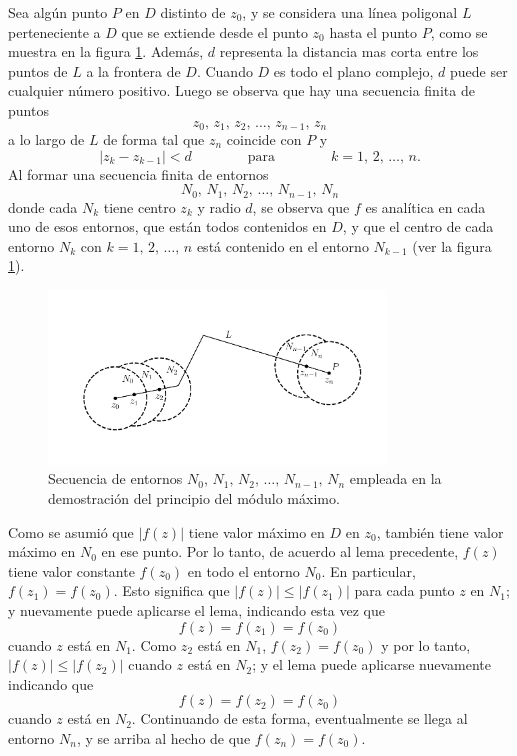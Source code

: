 \documentclass[a4paper]{report}
\begin{document}
Sea algún punto \(P\) en \(D\) distinto de \(z_0\), y se considera una línea poligonal \(L\) perteneciente a \(D\) que se extiende desde el punto \(z_0\) hasta el punto \(P\), como se muestra en la figura \ref{fig:maximum_modulus_principle_theorem}. Además, \(d\) representa la distancia mas corta entre los puntos de \(L\) a la frontera de \(D\). Cuando \(D\) es todo el plano complejo, \(d\) puede ser cualquier número positivo. Luego se observa que hay una secuencia finita de puntos
\[
 z_0,\,z_1,\,z_2,\,\dots,\,z_{n-1},\,z_n
\]
a lo largo de \(L\) de forma tal que \(z_n\) coincide con \(P\) y
\[
 |z_k-z_{k-1}|<d
 \qquad\qquad\textrm{para}\qquad\qquad
 k=1,\,2,\,\dots,\,n.
\]
Al formar una secuencia finita de entornos
\[
 N_0,\,N_1,\,N_2,\,\dots,\,N_{n-1},\,N_n
\]
donde cada \(N_k\) tiene centro \(z_k\) y radio \(d\), se observa que \(f\) es analítica en cada uno de esos entornos, que están todos contenidos en \(D\), y que el centro de cada entorno \(N_k\) con \(k=1,\,2,\,\dots,\,n\) está contenido en el entorno \(N_{k-1}\) (ver la figura \ref{fig:maximum_modulus_principle_theorem}).
\begin{figure}[!htb]
 \begin{center}
 \includegraphics[width=0.8\textwidth]{figuras/maximum_modulus_principle_theorem.pdf}
 \caption{\label{fig:maximum_modulus_principle_theorem} Secuencia de entornos \(N_0,\,N_1,\,N_2,\,\dots,\,N_{n-1},\,N_n\) empleada en la demostración del principio del módulo máximo.}
 \end{center}
\end{figure}


Como se asumió que \(|f(z)|\) tiene valor máximo en \(D\) en \(z_0\), también tiene valor máximo en \(N_0\) en ese punto. Por lo tanto, de acuerdo al lema precedente, \(f(z)\) tiene valor constante \(f(z_0)\) en todo el entorno \(N_0\). En particular, \(f(z_1)=f(z_0)\). Esto significa que \(|f(z)|\leq|f(z_1)|\) para cada punto \(z\) en \(N_1\); y nuevamente puede aplicarse el lema, indicando esta vez que 
\[
 f(z)=f(z_1)=f(z_0)
\]
cuando \(z\) está en \(N_1\). Como \(z_2\) está en \(N_1\), \(f(z_2)=f(z_0)\) y por lo tanto, \(|f(z)|\leq|f(z_2)|\) cuando \(z\) está en \(N_2\); y el lema puede aplicarse nuevamente indicando que 
\[
 f(z)=f(z_2)=f(z_0)
\]
cuando \(z\) está en \(N_2\). Continuando de esta forma, eventualmente se llega al entorno \(N_n\), y se arriba al hecho de que \(f(z_n)=f(z_0)\).
\end{document}
